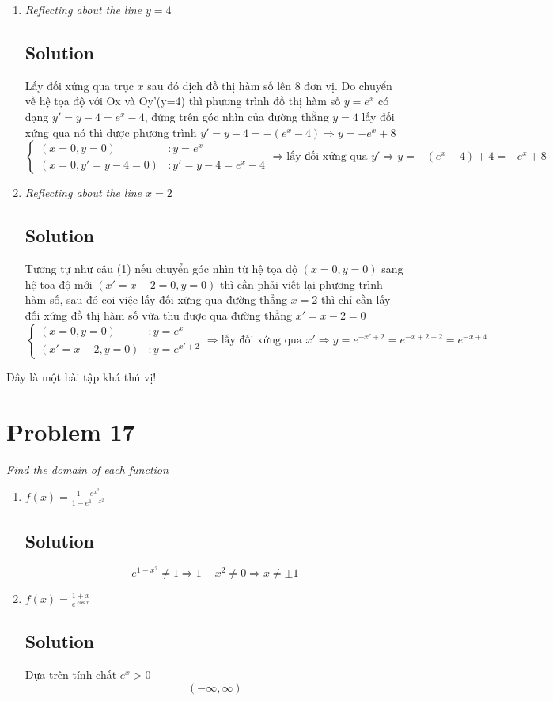 \documentclass[11pt]{article}
\newcommand{\soln}{\subsection*}
\newcommand{\qn}{\textit}
\begin{document}
\begin{enumerate}
	\item \qn{Reflecting about the line $y=4$}
	\soln{Solution}
	Lấy đối xứng qua trục $x$ sau đó dịch đồ thị hàm số lên 8 đơn vị. Do chuyển về hệ tọa độ với Ox và Oy'(y=4) thì phương trình đồ thị hàm số $y=e^x$ có dạng $y'=y-4=e^x-4$, đứng trên góc nhìn của đường thằng $y=4$ lấy đối xứng qua nó thì được phương trình $y'=y-4=-(e^x-4) \Rightarrow y=-e^x+8$
	\begin{equation*}
		\begin{cases}
			(x=0, y=0)&: y=e^x \\
			(x=0, y'=y-4=0)&: y'=y-4=e^x-4
		\end{cases}
		\Rightarrow \text{lấy đối xứng qua $y'$}
		\Rightarrow y=-(e^x-4)+4=-e^x+8 
	\end{equation*}
	
	\item \qn{Reflecting about the line $x=2$}
	\soln{Solution}
	Tương tự như câu (1) nếu chuyển góc nhìn từ hệ tọa độ $(x=0, y=0)$ sang hệ tọa độ mới $(x'=x-2=0, y=0)$ thì cần phải viết lại phương trình hàm số, sau đó coi việc lấy đối xứng qua đường thẳng $x=2$ thì chỉ cần lấy đối xứng đồ thị hàm số vừa thu được qua đường thẳng $x'=x-2=0$
	\begin{equation*}
		\begin{cases}
			(x=0, y=0)&: y=e^x \\
			(x'=x-2, y=0)&: y=e^{x'+2} 
		\end{cases}
		\Rightarrow \text{lấy đối xứng qua $x'$}
		\Rightarrow y=e^{-x'+2} = e^{-x+2+2}=e^{-x+4}
	\end{equation*}
\end{enumerate}
Đây là một bài tập khá thú vị!

\section*{Problem 17}

\qn{Find the domain of each function}

\begin{enumerate}
	\item \qn{$f(x)=\frac{1-e^{x^2}}{1-e^{1-x^2}}$}
	\soln{Solution}
	$$e^{1-x^2} \ne 1 \Rightarrow 1-x^2 \ne 0 \Rightarrow x \ne \pm 1$$
	
	\item \qn{$f(x)=\frac{1+x}{e^{\cos{x}}}$}
	\soln{Solution}
	Dựa trên tính chất $e^x>0$
	$$(-\infty, \infty)$$
\end{enumerate}
\end{document}
